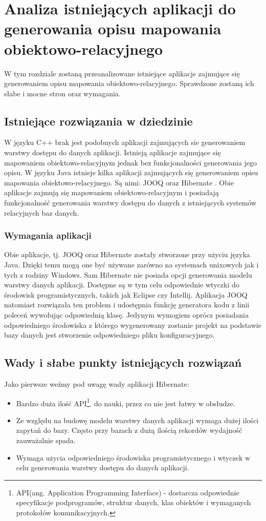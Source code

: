 \documentclass[12pt]{report}
\begin{document}
\chapter{Analiza istniejących aplikacji do generowania opisu mapowania obiektowo-relacyjnego}\label{chap:analiza}
W tym rozdziale zostaną przeanalizowane istniejące aplikacje zajmujące się generowaniem opisu mapowania obiektowo-relacyjnego. Sprawdzone zostaną ich słabe i mocne stron oraz wymagania.
\section{Istniejące rozwiązania w dziedzinie}
\indent W języku C++ brak jest podobnych aplikacji zajmujących sie generowaniem warstwy dostępu do danych aplikacji. Istnieją aplikacje zajmujące się mapowaniem obiektowo-relacyjnym jednak bez funkcjonalności generowania jego opisu. W języku Java istnieje kilka aplikacji zajmujących się generowaniem opisu mapowania obiektowo-relacyjnego. Są nimi: JOOQ \cite{jooqweb} oraz Hibernate \cite{hibernateweb}. Obie aplikacje zajmują się mapowaniem obiektowo-relacyjnym i posiadają funkcjonalność generowania warstwy dostępu do danych z istniejących systemów relacyjnych baz danych.
\subsection{Wymagania aplikacji}
Obie aplikacje, tj. JOOQ oraz Hibernate zostały stworzone przy użyciu języka Java. Dzięki temu mogą one być używane zarówno na systemach unixowych jak i tych z rodziny Windows.
Sam Hibernate nie posiada opcji generowania modelu warstwy danych aplikacji. Dostępne są w tym celu odpowiednie wtyczki do środowisk programistycznych, takich jak Eclipse czy Intellij. Aplikacja JOOQ natomiast rozwiązała ten problem i udostępnia funkcję generatora kodu z linii poleceń wywołując odpowiednią klasę.
Jedynym wymogiem oprócz posiadania odpowiedniego środowiska z którego wygenerowany zostanie projekt na podstawie bazy danych jest stworzenie odpowiedniego pliku konfiguracyjnego.
\section{Wady i słabe punkty istniejących rozwiązań}
Jako pierwsze weźmy pod uwagę wady aplikacji Hibernate:
\begin{itemize}
\item{Bardzo duża ilość API\footnote{API(ang. Application Programming Interface) - dostarcza odpowiednie specyfikacje podprogramów, struktur danych, klas obiektów i wymaganych protokołów komunikacyjnych.}. do nauki, przez co nie jest łatwy w obsłudze.}
\item{Ze względu na budowę modelu warstwy danych aplikacji wymaga dużej ilości zapytań do bazy. Często przy bazach z dużą ilością rekordów wydajność zauważalnie spada.}
\item{Wymaga użycia odpowiedniego środowiska programistycznego i wtyczek w celu generowania warstwy dostępu do danych aplikacji.}
\end{itemize}
\end{document}
